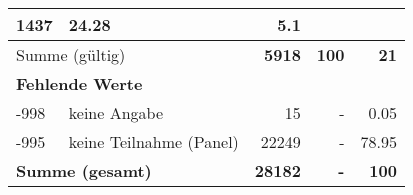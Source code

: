 \begin{longtable}{lXrrr}
       \num{1437} &
       \num[round-mode=places,round-precision=2]{24,28} &
         \num[round-mode=places,round-precision=2]{5,1} \\
     \midrule
     \multicolumn{2}{l}{Summe (gültig)} &
       \textbf{\num{5918}} &
     \textbf{100} &
       \textbf{\num[round-mode=places,round-precision=2]{21}} \\
     \multicolumn{5}{l}{\textbf{Fehlende Werte}}\\
       -998 &
       keine Angabe &
         \num{15} &
        - &
         \num[round-mode=places,round-precision=2]{0,05} \\
       -995 &
       keine Teilnahme (Panel) &
         \num{22249} &
        - &
         \num[round-mode=places,round-precision=2]{78,95} \\
     \midrule
     \multicolumn{2}{l}{\textbf{Summe (gesamt)}} &
          \textbf{\num{28182}} &
        \textbf{-} &
        \textbf{100} \\
     \bottomrule
     \end{longtable}
     

